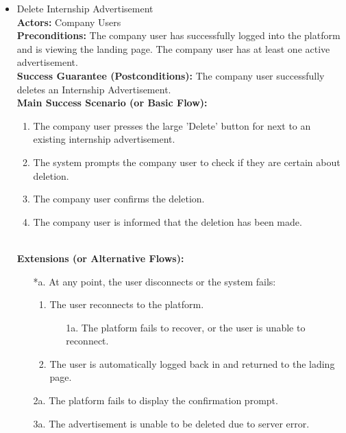 \begin{itemize}[label={[\textbf{UC}]}, align=left, leftmargin=*]
     \newpage
     \item {} Delete Internship Advertisement \\
     \textbf{Actors:} Company Users\\
     \textbf{Preconditions:} The company user has successfully logged into the platform and is viewing the landing page. The company user has at least one active advertisement.\\
     \textbf{Success Guarantee (Postconditions):} The company user successfully deletes an Internship Advertisement. \\
     \textbf{Main Success Scenario (or Basic Flow):} 
     \begin{enumerate}[label=\arabic*.] 
        \item The company user presses the large 'Delete' button for next to an existing internship advertisement. 
        \item The system prompts the company user to check if they are certain about deletion. 
        \item The company user confirms the deletion.
        \item The company user is informed that the deletion has been made. 
     \end{enumerate} \\

    \textbf{Extensions (or Alternative Flows):} 
    \begin{enumerate}[label=\arabic*.]
        \item[*a.] At any point, the user disconnects or the system fails:
            \begin{enumerate}[label=\arabic*.]
                \item The user reconnects to the platform.
                    \begin{enumerate}[label=\alph*.]
                        \item[1a.] The platform fails to recover, or the user is unable to reconnect.
                    \end{enumerate}
                 \item The user is automatically logged back in and returned to the lading page.
            \end{enumerate}
        \item[2a.] The platform fails to display the confirmation prompt.
        \item[3a.] The advertisement is unable to be deleted due to server error.
        \end{enumerate}
     
\end{itemize}

